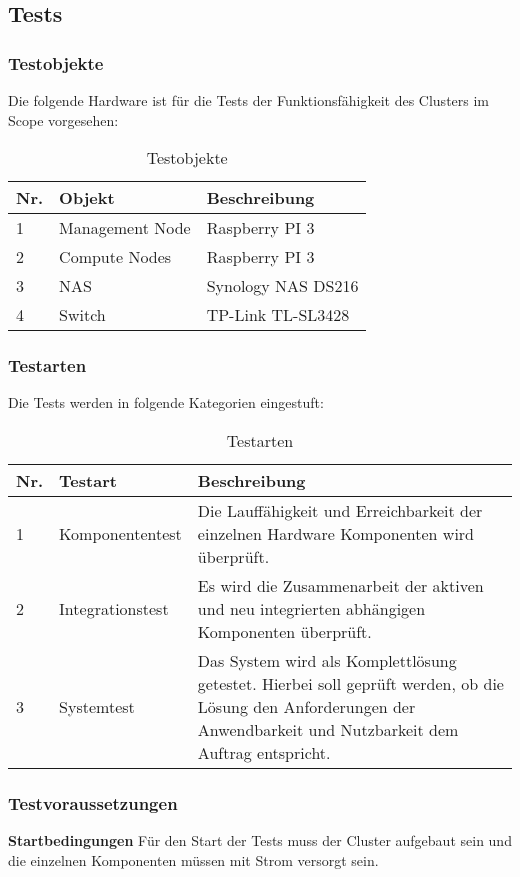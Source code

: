 \subsection{Tests}
\subsubsection{Testobjekte}
Die folgende Hardware ist für die Tests der Funktionsfähigkeit des Clusters im Scope vorgesehen:
\begin{table}[H]
\centering
\begin{tabular}{p{1cm}p{}p{7.5cm}}
\hline
\rowcolor{heading} \textbf{Nr.} & \textbf{Objekt} & \textbf{Beschreibung} \\\hline
1 & Management Node & Raspberry PI 3  \\\hline
2 & Compute Nodes & Raspberry PI 3 \\\hline
3 & NAS & Synology NAS DS216 \\\hline
4 & Switch & TP-Link TL-SL3428 \\\hline
\end{tabular}
\caption{Testobjekte}
\end{table}

\subsubsection{Testarten}
Die Tests werden in folgende Kategorien eingestuft:

\begin{table}[H]
\centering
\begin{tabular}{p{1cm}p{3cm}p{12cm}}
\hline
\rowcolor{heading} \textbf{Nr.} & \textbf{Testart} & \textbf{Beschreibung} \\\hline
1 & Komponententest & Die Lauffähigkeit und Erreichbarkeit der einzelnen Hardware Komponenten wird überprüft.  \\\hline
2 & Integrationstest & Es wird die Zusammenarbeit der aktiven und neu integrierten abhängigen Komponenten überprüft. \\\hline
3 & Systemtest & Das System wird als Komplettlösung getestet. Hierbei soll geprüft werden, ob die Lösung den Anforderungen der Anwendbarkeit und Nutzbarkeit dem Auftrag entspricht.  \\\hline
\end{tabular}
\caption{Testarten}
\end{table}

\subsubsection{Testvoraussetzungen}
\textbf{Startbedingungen}\newline
Für den Start der Tests muss der Cluster aufgebaut sein und die einzelnen Komponenten müssen mit Strom versorgt sein. 

